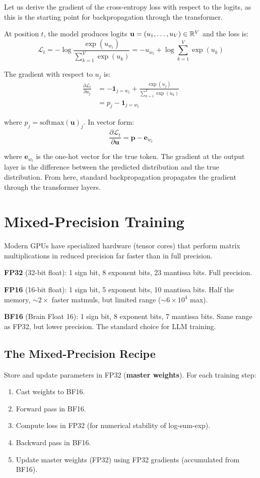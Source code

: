 \documentclass[main.tex]{subfiles}
\begin{document}
Let us derive the gradient of the cross-entropy loss with respect to the logits, as this is the starting point for backpropagation through the transformer.

At position $t$, the model produces logits $\mathbf{u} = (u_1, \ldots, u_V) \in \mathbb{R}^V$ and the loss is:
$$\mathcal{L}_t = -\log\frac{\exp(u_{w_t})}{\sum_{k=1}^{V}\exp(u_k)} = -u_{w_t} + \log\sum_{k=1}^{V}\exp(u_k)$$

The gradient with respect to $u_j$ is:
\begin{align}
\frac{\partial \mathcal{L}_t}{\partial u_j} &= -\mathbf{1}_{j = w_t} + \frac{\exp(u_j)}{\sum_{k=1}^{V}\exp(u_k)} \\[6pt]
&= p_j - \mathbf{1}_{j = w_t}
\end{align}

where $p_j = \text{softmax}(\mathbf{u})_j$. In vector form:
$$\boxed{\frac{\partial \mathcal{L}_t}{\partial \mathbf{u}} = \mathbf{p} - \mathbf{e}_{w_t}}$$

where $\mathbf{e}_{w_t}$ is the one-hot vector for the true token. The gradient at the output layer is the difference between the predicted distribution and the true distribution. From here, standard backpropagation propagates the gradient through the transformer layers.

\needspace{0.33\textheight}
\section{Mixed-Precision Training}

Modern GPUs have specialized hardware (tensor cores) that perform matrix multiplications in reduced precision far faster than in full precision.

\textbf{FP32} (32-bit float): 1 sign bit, 8 exponent bits, 23 mantissa bits. Full precision.

\textbf{FP16} (16-bit float): 1 sign bit, 5 exponent bits, 10 mantissa bits. Half the memory, $\sim\!2\times$ faster matmuls, but limited range ($\sim 6 \times 10^4$ max).

\textbf{BF16} (Brain Float 16): 1 sign bit, 8 exponent bits, 7 mantissa bits. Same range as FP32, but lower precision. The standard choice for LLM training.

\subsection{The Mixed-Precision Recipe}

Store and update parameters in FP32 (\textbf{master weights}). For each training step:
\begin{enumerate}
    \item Cast weights to BF16.
    \item Forward pass in BF16.
    \item Compute loss in FP32 (for numerical stability of log-sum-exp).
    \item Backward pass in BF16.
    \item Update master weights (FP32) using FP32 gradients (accumulated from BF16).
\end{enumerate}
\end{document}
